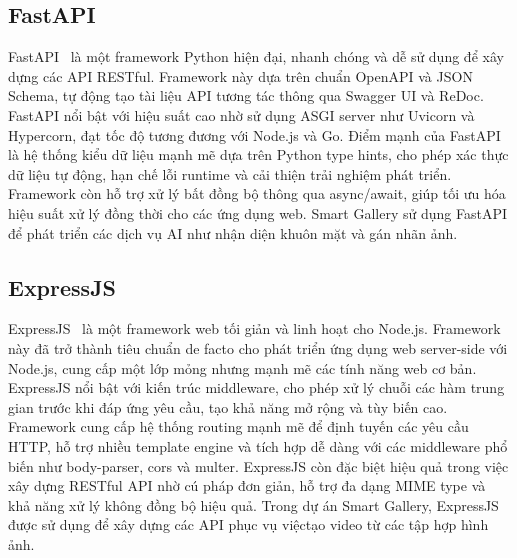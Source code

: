 \subsection{FastAPI}
FastAPI~\cite{fastapidoc} là một framework Python hiện đại, nhanh chóng và dễ sử dụng để xây dựng các API RESTful. Framework này dựa trên chuẩn OpenAPI và JSON Schema, tự động tạo tài liệu API tương tác thông qua Swagger UI và ReDoc. FastAPI nổi bật với hiệu suất cao nhờ sử dụng ASGI server như Uvicorn và Hypercorn, đạt tốc độ tương đương với Node.js và Go. Điểm mạnh của FastAPI là hệ thống kiểu dữ liệu mạnh mẽ dựa trên Python type hints, cho phép xác thực dữ liệu tự động, hạn chế lỗi runtime và cải thiện trải nghiệm phát triển. Framework còn hỗ trợ xử lý bất đồng bộ thông qua async/await, giúp tối ưu hóa hiệu suất xử lý đồng thời cho các ứng dụng web. Smart Gallery sử dụng FastAPI để phát triển các dịch vụ AI như nhận diện khuôn mặt và gán nhãn ảnh.

\subsection{ExpressJS}
ExpressJS~\cite{expressjsdoc} là một framework web tối giản và linh hoạt cho Node.js. Framework này đã trở thành tiêu chuẩn de facto cho phát triển ứng dụng web server-side với Node.js, cung cấp một lớp mỏng nhưng mạnh mẽ các tính năng web cơ bản. ExpressJS nổi bật với kiến trúc middleware, cho phép xử lý chuỗi các hàm trung gian trước khi đáp ứng yêu cầu, tạo khả năng mở rộng và tùy biến cao. Framework cung cấp hệ thống routing mạnh mẽ để định tuyến các yêu cầu HTTP, hỗ trợ nhiều template engine và tích hợp dễ dàng với các middleware phổ biến như body-parser, cors và multer. ExpressJS còn đặc biệt hiệu quả trong việc xây dựng RESTful API nhờ cú pháp đơn giản, hỗ trợ đa dạng MIME type và khả năng xử lý không đồng bộ hiệu quả. Trong dự án Smart Gallery, ExpressJS được sử dụng để xây dựng các API phục vụ việctạo video từ các tập hợp hình ảnh.
